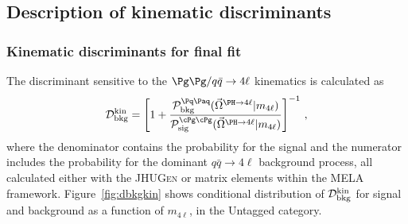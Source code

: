 
\subsection{Description of kinematic discriminants}
\label{sec:kindistr}

\subsubsection{Kinematic discriminants for final fit}
The discriminant sensitive to the $\Pg\Pg/q\bar{q}\to4\ell$ kinematics is calculated as~\cite{Chatrchyan:2012ufa,Khachatryan:2014kca} 
\begin{eqnarray}
%
\label{eq:ggmela}
\mathcal{D}^{\rm kin}_{\rm bkg} = 
\left[1+  \frac{ \mathcal{P}^{\Pq \Paq }_\text{bkg} (\vec\Omega^{\PH\to4\ell} | m_{4\ell})  }
{ \mathcal{P}^{\cPg\cPg}_\text{sig}(\vec\Omega^{\PH\to4\ell} | m_{4\ell}) } \right]^{-1}\,,
%
\end{eqnarray}
where the denominator contains the probability for the signal 
and the numerator includes the probability for the dominant $q\bar{q}\to4\ell$ background process, 
all calculated either with the 
\textsc{JHUGen} or \MCFM matrix elements within the MELA framework.
Figure~\ref{fig:dbkgkin} shows conditional distribution of $\mathcal{D}^{\rm kin}_{\rm bkg}$ for signal and background as a function of $m_{4\ell}$, in the Untagged category.

